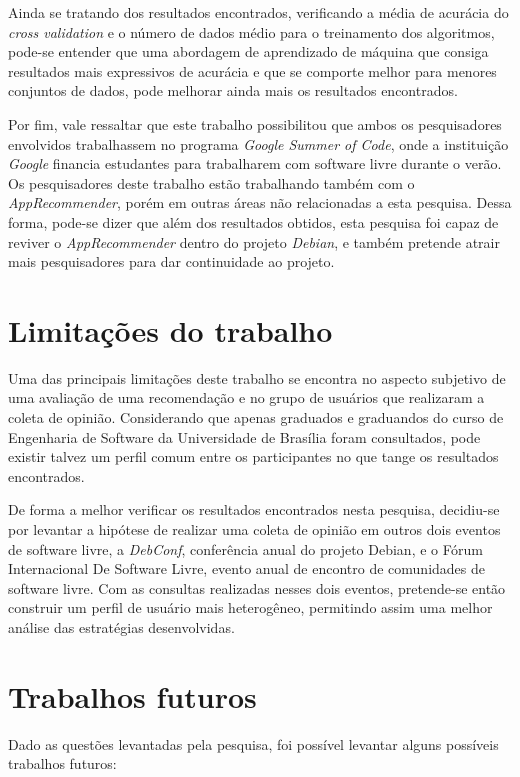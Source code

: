 Ainda se tratando dos resultados encontrados, verificando a média de acurácia do
\textit{cross validation} e o número de dados médio para o treinamento dos
algoritmos, pode-se entender que uma abordagem de aprendizado de máquina que
consiga resultados mais expressivos de acurácia e que se comporte melhor para
menores conjuntos de dados, pode melhorar ainda mais os resultados encontrados.

Por fim, vale ressaltar que este
trabalho possibilitou que ambos os pesquisadores envolvidos trabalhassem no
programa \textit{Google Summer of Code}, onde a instituição \textit{Google}
financia estudantes para trabalharem com software livre durante o verão. Os
pesquisadores deste trabalho estão trabalhando também com o
\textit{AppRecommender}, porém em outras áreas não relacionadas a esta pesquisa.
Dessa forma, pode-se dizer que além dos resultados obtidos, esta pesquisa foi
capaz de reviver o \textit{AppRecommender} dentro do projeto \textit{Debian},
e também pretende atrair mais pesquisadores para dar continuidade ao projeto.

\section{Limitações do trabalho}

Uma das principais limitações deste trabalho se encontra no aspecto subjetivo de
uma avaliação de uma recomendação e no grupo de usuários que realizaram a coleta
de opinião. Considerando que apenas graduados e graduandos do curso de Engenharia
de Software da Universidade de Brasília foram consultados, pode existir talvez
um perfil comum entre os participantes no que tange os resultados encontrados.

De forma a melhor verificar os resultados encontrados nesta pesquisa, decidiu-se
por levantar a hipótese de realizar uma coleta de opinião em outros dois eventos
de software livre, a \textit{DebConf}, conferência anual do projeto Debian, e o
Fórum Internacional De Software Livre, evento anual de encontro de
comunidades de software livre. Com as consultas realizadas nesses dois eventos,
pretende-se então construir um perfil de usuário mais heterogêneo, permitindo
assim uma melhor análise das estratégias desenvolvidas.

\section{Trabalhos futuros}

Dado as questões levantadas pela pesquisa, foi possível levantar alguns
possíveis trabalhos futuros:


